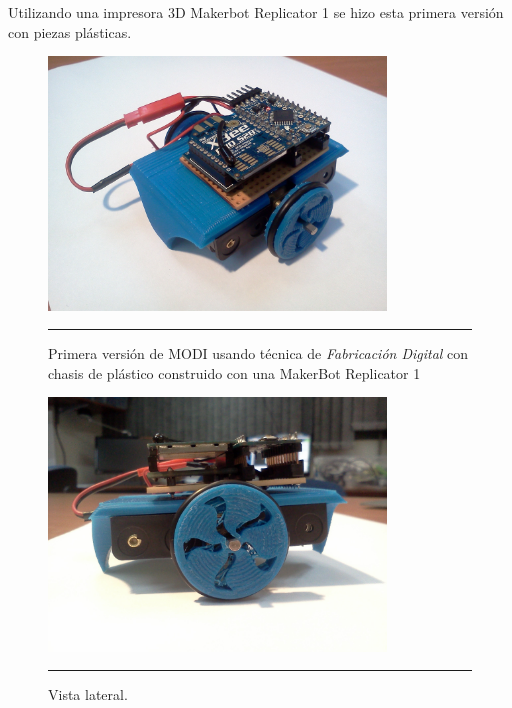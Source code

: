 Utilizando una impresora 3D Makerbot Replicator 1 se hizo esta primera versión con piezas plásticas.

\begin{figure}[htbp]
	\centering
		\includegraphics[width=0.8\textwidth]{./Pictures/MODIrev2.jpg}
		\rule{35em}{0.5pt}
	\caption[modireplicator]{Primera versión de MODI usando técnica de \emph{ Fabricación Digital }con chasis de plástico construido con una MakerBot Replicator 1}
	\label{fig:modireplicator}
\end{figure}

\begin{figure}[htbp]
	\centering
		\includegraphics[width=0.8\textwidth]{./Pictures/2MODIrev2.jpg}
		\rule{35em}{0.5pt}
	\caption[vista lateral]{Vista lateral.}
	\label{fig:vistalaterial}
\end{figure}

